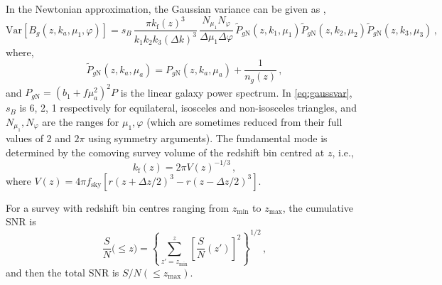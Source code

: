 In the Newtonian approximation, the Gaussian variance can be given as \citep{Scoccimarro:2003wn, Karagiannis:2018jdt},
\begin{equation}
\mathrm{Var} [{B_{g}}(z, k_a,\mu_{1},\varphi)] = s_B\, \frac{\pi k_{\mathrm{f}}(z)^3}{k_1k_2k_3 (\Delta k)^3}\,\frac{N_{\mu_1}N_\varphi}{\Delta \mu_1 \Delta \varphi} \, \tilde{P}_{g{\mathrm{N}}}(z,k_{1},\mu_{1}) \tilde{P}_{g{\mathrm{N}}}(z,k_{2},\mu_{2})\tilde{P}_{g{\mathrm{N}}}(z,k_{3},\mu_{3})\,,
\label{eq:gaussvar} 
\end{equation}
where,
\begin{equation}
\tilde{P}_{g{\mathrm{N}}}(z, k_{a}, \mu_{a}) = P_{g{\mathrm{N}}}(z, k_{a}, \mu_{a}) + \frac{1}{n_g(z)}\,, \label{eq:Pgdef} 
\end{equation}
and ${P}_{g{\mathrm{N}}}=(b_1+f\mu_a^2)^2P$ is the linear galaxy power spectrum.
In \eqref{eq:gaussvar}, $s_{B}$ is 6, 2, 1 respectively for equilateral, isosceles and non-isosceles triangles, and $N_{\mu_1},N_\varphi$ are the ranges for $\mu_1,  \varphi $ (which are sometimes reduced from their full values of 2 and $2\pi$ using symmetry arguments).
The fundamental mode is determined by the comoving survey volume of the redshift bin centred at $z$, i.e.,
\begin{equation}\label{eq:kfundamental}
    k_{\mathrm{f}}(z) = {2\pi}{V(z)^{-1/3}}\,,
\end{equation}
where $V(z)=4\pi  f_{\mathrm{sky}}[r(z+\Delta z/2)^3 - r(z-\Delta z/2)^3]$.

For a survey with redshift bin centres ranging from $z_{\mathrm{min}}$ to $z_{\mathrm{max}}$,  the cumulative SNR  is
\begin{equation} \label{csnr}
\frac{S}{N}\big(\leq z\big) = \left\{\sum_{z'=z_{\mathrm{min}}}^z \left[\frac{S}{N}(z')\right]^{2} \right\}^{1/2}\,,
\end{equation}
and then the total SNR is $S/N(\leq z_{\mathrm{max}})$.
%

